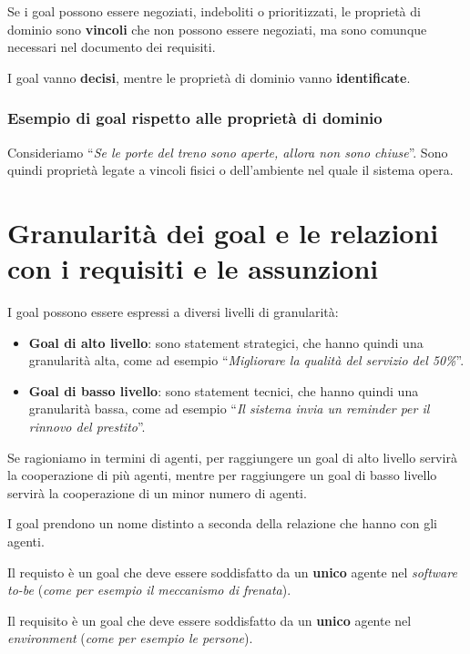 Se i goal possono essere negoziati, indeboliti o prioritizzati, le proprietà di
dominio sono \textbf{vincoli} che non possono essere negoziati, ma sono comunque 
necessari nel documento dei requisiti.

\begin{tcolorbox}
    I goal vanno \textbf{decisi}, mentre le proprietà di dominio vanno \textbf{identificate}.
\end{tcolorbox}
\subsubsection{Esempio di goal rispetto alle proprietà di dominio}
Consideriamo ``\textit{Se le porte del treno sono aperte, allora non sono 
chiuse}''. Sono quindi proprietà legate a vincoli fisici o dell'ambiente nel 
quale il sistema opera.
\section{Granularità dei goal e le relazioni con i requisiti e le assunzioni}
I goal possono essere espressi a diversi livelli di granularità:
\begin{itemize}
    \item \textbf{Goal di alto livello}: sono statement strategici, che hanno quindi 
    una granularità alta, come ad esempio ``\textit{Migliorare la qualità del servizio del 50\%}''.
    \item \textbf{Goal di basso livello}: sono statement tecnici, che hanno quindi
    una granularità bassa, come ad esempio ``\textit{Il sistema invia un reminder
    per il rinnovo del prestito}''.
\end{itemize}
Se ragioniamo in termini di agenti, per raggiungere un goal di alto livello
servirà la cooperazione di più agenti, mentre per raggiungere un goal di basso
livello servirà la cooperazione di un minor numero di agenti.

I goal prendono un nome distinto a seconda della relazione che hanno con gli agenti.
\begin{tcolorbox}[colback=lime!5!white,colframe=lime!75!black, title=Requisto]
    Il requisto è un goal che deve essere soddisfatto da un \textbf{unico} agente 
    nel \textit{software to-be} (\textit{come per esempio il meccanismo di frenata}).
\end{tcolorbox}
\begin{tcolorbox}[colback=orange!5!white,colframe=orange!75!black, title=Prospettiva]
    Il requisito è un goal che deve essere soddisfatto da un \textbf{unico} agente 
    nel \textit{environment} (\textit{come per esempio le persone}).
\end{tcolorbox}
